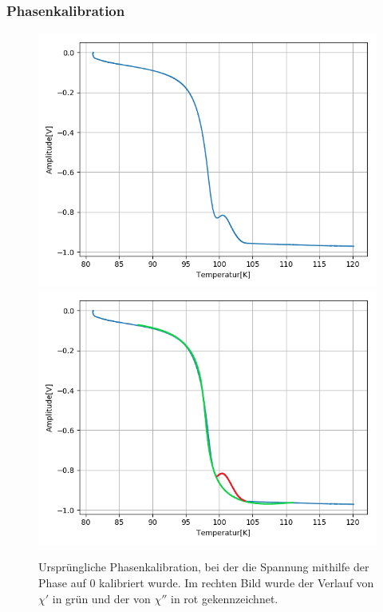 \documentclass[12pt,a4paper]{article}
\begin{document}
\subsubsection{Phasenkalibration}
\begin{figure}
\centering
\includegraphics[scale=0.5]{Bilder/Haupt_Supra/Kalialt.png}
\includegraphics[scale=0.5]{Bilder/Haupt_Supra/Kalialt_2.png}
\caption{Ursprüngliche Phasenkalibration, bei der die Spannung mithilfe der Phase auf 0 kalibriert wurde. Im rechten Bild wurde der Verlauf von $\chi'$ in grün und der von $\chi''$ in rot gekennzeichnet.}
\label{fig:Supra_Kalialt}
\end{figure}
\end{document}
